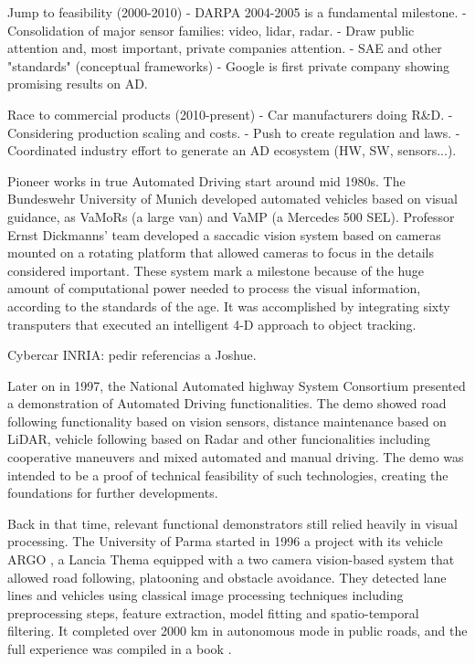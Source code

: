 Jump to feasibility (2000-2010)
  - DARPA 2004-2005 is a fundamental milestone.
  - Consolidation of major sensor families: video, lidar, radar.
  - Draw public attention and, most important, private companies attention.
  - SAE and other "standards" (conceptual frameworks)
  - Google is first private company showing promising results on AD.

Race to commercial products (2010-present)
  - Car manufacturers doing R\&D.
  - Considering production scaling and costs.
  - Push to create regulation and laws.
  - Coordinated industry effort to generate an AD ecosystem (HW, SW, 
  sensors...).


Pioneer works in true Automated Driving start around mid 1980s. The
Bundeswehr University of Munich developed automated vehicles based on visual 
guidance, as VaMoRs \cite{Dickmanns1987} (a large van) and VaMP 
\cite{Gregor2002} (a Mercedes 500 SEL). Professor Ernst Dickmanns' team 
developed a saccadic vision system based on cameras mounted on a rotating 
platform that allowed cameras to focus in the details considered important.
These system mark a milestone because of the huge amount of computational power 
needed to process the visual information, according to the standards of the 
age. It was accomplished by integrating sixty transputers that executed an
intelligent 4-D approach to object tracking.

Cybercar INRIA: pedir referencias a Joshue.

Later on in 1997, the National Automated highway System Consortium presented a 
demonstration of Automated Driving functionalities\cite{Thorpe1997}. 
The demo showed road following functionality based on vision sensors, 
distance maintenance based on LiDAR, vehicle following based on Radar
and other funcionalities including cooperative maneuvers and mixed automated 
and manual driving. 
The demo was intended to be a proof of technical feasibility of such 
technologies, creating the foundations for further developments.

Back in that time, relevant functional demonstrators still relied
heavily in visual processing. The University of Parma started in 1996 a
project with its vehicle ARGO \cite{Broggi1998}, a Lancia Thema equipped with 
a two camera vision-based system that allowed road following, platooning and 
obstacle avoidance. They detected lane lines and vehicles using classical image 
processing techniques including preprocessing steps, feature extraction,
model fitting and spatio-temporal filtering.
It completed over 2000 km in autonomous mode in public roads, and the 
full experience was compiled in a book \cite{Broggi1999}.

